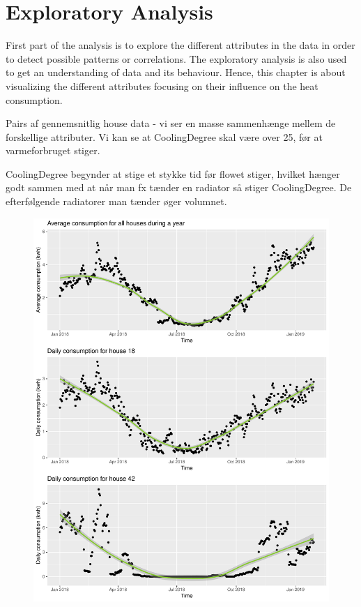 \chapter{Exploratory Analysis}
First part of the analysis is to explore the different attributes in the data in order to detect possible patterns or correlations. The exploratory analysis is also used to get an understanding of data and its behaviour. Hence, this chapter is about visualizing the different attributes focusing on their influence on the heat consumption. 


Pairs af gennemsnitlig house data - vi ser en masse sammenhænge mellem de forskellige attributer. Vi kan se at CoolingDegree skal være over 25, før at varmeforbruget stiger.

CoolingDegree begynder at stige et stykke tid før flowet stiger, hvilket hænger godt sammen med at når man fx tænder en radiator så stiger CoolingDegree. De efterfølgende radiatorer man tænder øger volumnet. 
\begin{figure}[H]
    \centering
    \includegraphics[width=1.\textwidth]{../../../figures/daily_cons.pdf}
    \caption{}
    \label{fig:}
\end{figure}


